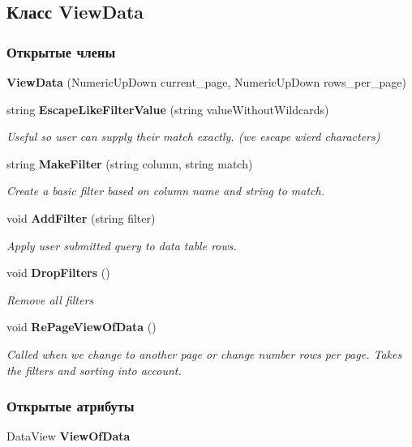 \subsection{Класс View\+Data}
\label{classkdz__manager_1_1_view_data}
\subsubsection*{Открытые члены}
\begin{DoxyCompactItemize}
\item 
{\bfseries View\+Data} (Numeric\+Up\+Down current\+\_\+page, Numeric\+Up\+Down rows\+\_\+per\+\_\+page)\label{classkdz__manager_1_1_view_data_ae1a1da13bff2e5d8259d85c70dae2942}

\item 
string {\bf Escape\+Like\+Filter\+Value} (string value\+Without\+Wildcards)
\begin{DoxyCompactList}\small\item\em Useful so user can supply their match exactly. (we escape wierd characters) \end{DoxyCompactList}\item 
string {\bf Make\+Filter} (string column, string match)
\begin{DoxyCompactList}\small\item\em Create a basic filter based on column name and string to match. \end{DoxyCompactList}\item 
void {\bf Add\+Filter} (string filter)
\begin{DoxyCompactList}\small\item\em Apply user submitted query to data table rows. \end{DoxyCompactList}\item 
void {\bf Drop\+Filters} ()
\begin{DoxyCompactList}\small\item\em Remove all filters \end{DoxyCompactList}\item 
void {\bf Re\+Page\+View\+Of\+Data} ()
\begin{DoxyCompactList}\small\item\em Called when we change to another page or change number rows per page. Takes the filters and sorting into account. \end{DoxyCompactList}\end{DoxyCompactItemize}
\subsubsection*{Открытые атрибуты}
\begin{DoxyCompactItemize}
\item 
Data\+View {\bfseries View\+Of\+Data}\label{classkdz__manager_1_1_view_data_a67265c8fe68255aced381b1e695edb0f}

\end{DoxyCompactItemize}
